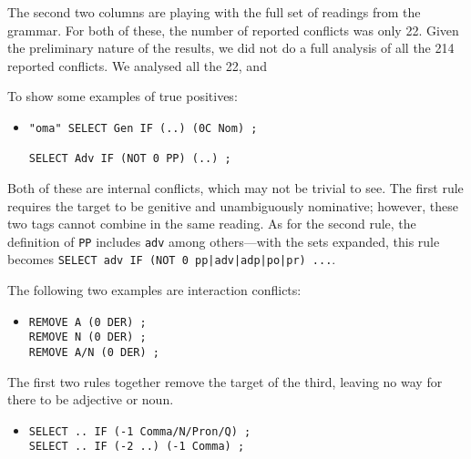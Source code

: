 
The second two columns are playing with the full set of readings from the grammar. For both of these, the number of reported conflicts was only 22.
Given the preliminary nature of the results, we did not do a full analysis of all the 214 reported conflicts.
We analysed all the 22, and 





To show some examples of true positives:


\begin{itemize}
\item[]\begin{verbatim}
"oma" SELECT Gen IF (..) (0C Nom) ;

SELECT Adv IF (NOT 0 PP) (..) ;
\end{verbatim}
\end{itemize}

Both of these are internal conflicts, which may not be trivial to see.
The first rule requires the target to be genitive and unambiguously nominative; however, these two tags cannot combine in the same reading.
As for the second rule, the definition of \texttt{PP} includes \texttt{adv} among others---with the sets expanded, this rule becomes \texttt{SELECT adv IF (NOT 0 pp|adv|adp|po|pr) ...}.

The following two examples are interaction conflicts:

\begin{itemize}
\item[]\begin{verbatim}
REMOVE A (0 DER) ; 
REMOVE N (0 DER) ; 
REMOVE A/N (0 DER) ; 
\end{verbatim}
\end{itemize}

The first two rules together remove the target of the third, leaving no way for there to be adjective or noun.

\begin{itemize}
\item[]\begin{verbatim}
SELECT .. IF (-1 Comma/N/Pron/Q) ;
SELECT .. IF (-2 ..) (-1 Comma) ;
\end{verbatim}
\end{itemize}

